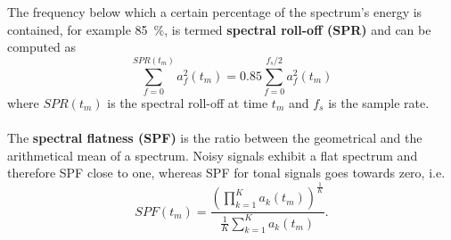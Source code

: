 The frequency below which a certain percentage of the spectrum's energy is contained, for example \SI{85}{\percent}, is termed \textbf{spectral roll-off (SPR)} and can be computed as
\begin{equation}
 \displaystyle \sum_{f=0}^{SPR(t_m)} a_f^{2}(t_m) = 0.85 \displaystyle \sum_{f=0}^{f_s/2} a_f^{2}(t_m)
\end{equation}
where $SPR(t_m)$ is the spectral roll-off at time $t_m$ and $f_s$ is the sample rate.\\~\\

The \textbf{spectral flatness (SPF)} is the ratio between the geometrical and the arithmetical mean of a spectrum. Noisy signals exhibit a flat spectrum and therefore SPF close to one, whereas SPF for tonal signals goes towards zero, i.e.
\begin{equation}
SPF(t_m) = \frac{\left(\displaystyle \prod_{k=1}^{K}a_k(t_m) \right)^{\frac{1}{K}}}{\displaystyle \frac{1}{K}\displaystyle \sum_{k=1}^{K} a_k(t_m)}.
\end{equation}\\

